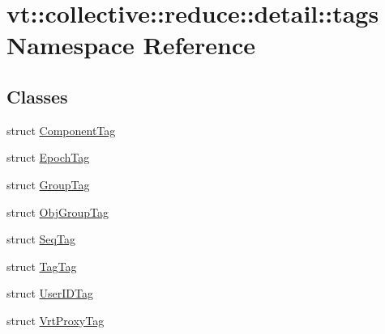 \hypertarget{namespacevt_1_1collective_1_1reduce_1_1detail_1_1tags}{}\section{vt\+:\+:collective\+:\+:reduce\+:\+:detail\+:\+:tags Namespace Reference}
\label{namespacevt_1_1collective_1_1reduce_1_1detail_1_1tags}
\subsection*{Classes}
\begin{DoxyCompactItemize}
\item 
struct \hyperlink{structvt_1_1collective_1_1reduce_1_1detail_1_1tags_1_1_component_tag}{Component\+Tag}
\item 
struct \hyperlink{structvt_1_1collective_1_1reduce_1_1detail_1_1tags_1_1_epoch_tag}{Epoch\+Tag}
\item 
struct \hyperlink{structvt_1_1collective_1_1reduce_1_1detail_1_1tags_1_1_group_tag}{Group\+Tag}
\item 
struct \hyperlink{structvt_1_1collective_1_1reduce_1_1detail_1_1tags_1_1_obj_group_tag}{Obj\+Group\+Tag}
\item 
struct \hyperlink{structvt_1_1collective_1_1reduce_1_1detail_1_1tags_1_1_seq_tag}{Seq\+Tag}
\item 
struct \hyperlink{structvt_1_1collective_1_1reduce_1_1detail_1_1tags_1_1_tag_tag}{Tag\+Tag}
\item 
struct \hyperlink{structvt_1_1collective_1_1reduce_1_1detail_1_1tags_1_1_user_i_d_tag}{User\+I\+D\+Tag}
\item 
struct \hyperlink{structvt_1_1collective_1_1reduce_1_1detail_1_1tags_1_1_vrt_proxy_tag}{Vrt\+Proxy\+Tag}
\end{DoxyCompactItemize}
